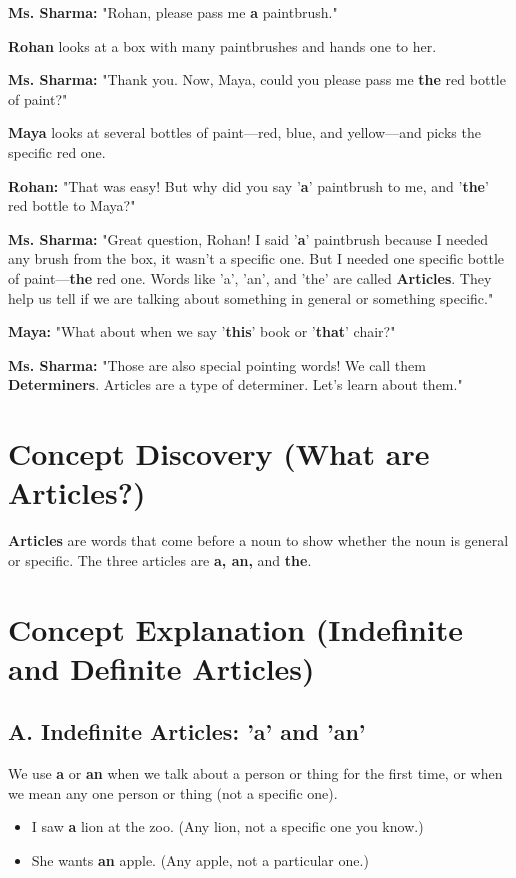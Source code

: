 \textbf{Ms. Sharma:} "Rohan, please pass me \textbf{a} paintbrush."

\textbf{Rohan} looks at a box with many paintbrushes and hands one to her.

\textbf{Ms. Sharma:} "Thank you. Now, Maya, could you please pass me \textbf{the} red bottle of paint?"

\textbf{Maya} looks at several bottles of paint—red, blue, and yellow—and picks the specific red one.

\textbf{Rohan:} "That was easy! But why did you say '\textbf{a}' paintbrush to me, and '\textbf{the}' red bottle to Maya?"

\textbf{Ms. Sharma:} "Great question, Rohan! I said '\textbf{a}' paintbrush because I needed any brush from the box, it wasn't a specific one. But I needed one specific bottle of paint—\textbf{the} red one. Words like 'a', 'an', and 'the' are called \textbf{Articles}. They help us tell if we are talking about something in general or something specific."

\textbf{Maya:} "What about when we say '\textbf{this}' book or '\textbf{that}' chair?"

\textbf{Ms. Sharma:} "Those are also special pointing words! We call them \textbf{Determiners}. Articles are a type of determiner. Let's learn about them."

\section{Concept Discovery (What are Articles?)}
\textbf{Articles} are words that come before a noun to show whether the noun is general or specific. The three articles are \textbf{a, an,} and \textbf{the}.

\section{Concept Explanation (Indefinite and Definite Articles)}

\subsection*{A. Indefinite Articles: 'a' and 'an'}
We use \textbf{a} or \textbf{an} when we talk about a person or thing for the first time, or when we mean any one person or thing (not a specific one).
\begin{itemize}
    \item I saw \textbf{a} lion at the zoo. (Any lion, not a specific one you know.)
    \item She wants \textbf{an} apple. (Any apple, not a particular one.)
\end{itemize}

